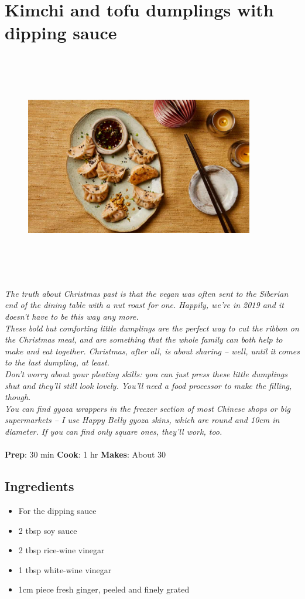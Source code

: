 \documentclass{book}
\begin{document}
\section{Kimchi and tofu dumplings with dipping sauce}
\begin{figure}
\centering\includegraphics[width=10cm,height=10cm,keepaspectratio]{Recipe_Pictures/Kimchi_and_tofu_dumplings_with_dipping_sauce.png}
\end{figure}
\emph{The truth about Christmas past is that the vegan was often sent to the Siberian end of the dining table with a nut roast for one. Happily, we’re in 2019 and it doesn’t have to be this way any more.\\ 
These bold but comforting little dumplings are the perfect way to cut the ribbon on the Christmas meal, and are something that the whole family can both help to make and eat together. Christmas, after all, is about sharing – well, until it comes to the last dumpling, at least.\\ 
Don’t worry about your pleating skills: you can just press these little dumplings shut and they’ll still look lovely. You’ll need a food processor to make the filling, though.\\ 
You can find gyoza wrappers in the freezer section of most Chinese shops or big supermarkets – I use Happy Belly gyoza skins, which are round and 10cm in diameter. If you can find only square ones, they’ll work, too.}\\\\ 
\textbf{Prep}: 30 min
\textbf{Cook}: 1 hr
\textbf{Makes}: About 30
\subsection*{Ingredients}
\begin{itemize}
\item For the dipping sauce
\item 2 tbsp soy sauce
\item 2 tbsp rice-wine vinegar
\item 1 tbsp white-wine vinegar
\item 1cm piece fresh ginger, peeled and finely grated
\end{itemize}
\end{document}
